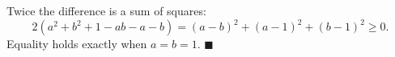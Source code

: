 Twice the difference is a sum of squares:
\[2(a^2+b^2+1-ab-a-b)=(a-b)^2+(a-1)^2+(b-1)^2\ge0.\]
Equality holds exactly when $a=b=1$. $\blacksquare$
